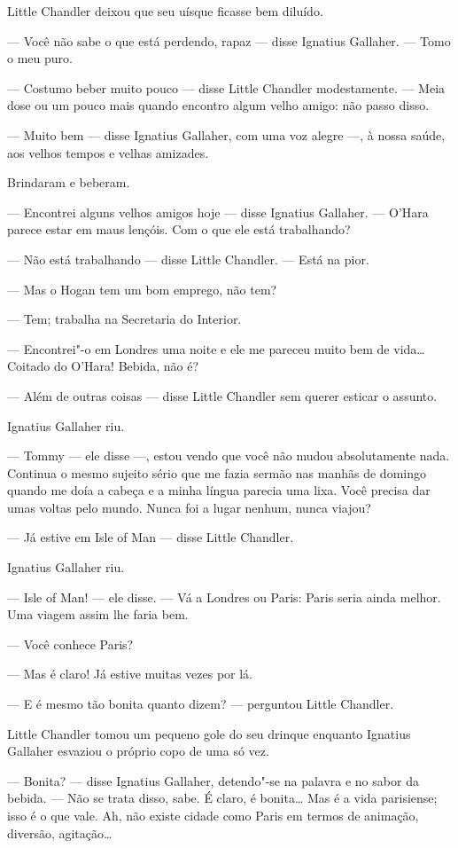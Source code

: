 Little Chandler deixou que seu uísque ficasse bem diluído.

--- Você não sabe o que está perdendo, rapaz --- disse Ignatius Gallaher.  ---
Tomo o meu puro.

--- Costumo beber muito pouco --- disse Little Chandler modestamente.  --- Meia
dose ou um pouco mais quando encontro algum velho amigo: não passo disso.

--- Muito bem --- disse Ignatius Gallaher, com uma voz alegre ---, à nossa
saúde, aos velhos tempos e velhas amizades.

Brindaram e beberam.

--- Encontrei alguns velhos amigos hoje --- disse Ignatius Gallaher.  ---
O’Hara parece estar em maus lençóis.  Com o que ele está trabalhando?

--- Não está trabalhando --- disse Little Chandler.  --- Está na pior.

--- Mas o Hogan tem um bom emprego, não tem?

--- Tem; trabalha na Secretaria do Interior.

--- Encontrei"-o em Londres uma noite e ele me pareceu muito bem de vida\ldots{}
Coitado do O’Hara!  Bebida, não é?

--- Além de outras coisas --- disse Little Chandler sem querer esticar o
assunto.

Ignatius Gallaher riu.

--- Tommy --- ele disse ---, estou vendo que você não mudou absolutamente nada.
Continua o mesmo sujeito sério que me fazia sermão nas manhãs de domingo quando
me doía a cabeça e a minha língua parecia uma lixa.  Você precisa dar umas
voltas pelo mundo.  Nunca foi a lugar nenhum, nunca viajou?

--- Já estive em Isle of Man --- disse Little Chandler.

Ignatius Gallaher riu.

--- Isle of Man! --- ele disse.  --- Vá a Londres ou Paris: Paris seria ainda
melhor.  Uma viagem assim lhe faria bem.

--- Você conhece Paris?

--- Mas é claro!  Já estive muitas vezes por lá.

--- E é mesmo tão bonita quanto dizem? --- perguntou Little Chandler.

Little Chandler tomou um pequeno gole do seu drinque enquanto Ignatius Gallaher
esvaziou o próprio copo de uma só vez.

--- Bonita? --- disse Ignatius Gallaher, detendo"-se na palavra e no sabor da
bebida.  --- Não se trata disso, sabe.  É claro, é bonita\ldots{}  Mas é a vida
parisiense; isso é o que vale.  Ah, não existe cidade como Paris em termos de
animação, diversão, agitação\ldots{}

